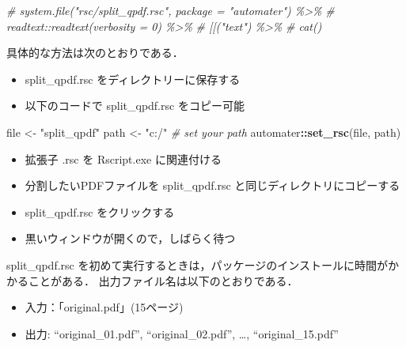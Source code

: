 \documentclass[
]{article}
\newenvironment{Shaded}{\begin{snugshade}}{\end{snugshade}}
\newcommand{\CommentTok}[1]{\textcolor[rgb]{0.56,0.35,0.01}{\textit{#1}}}
\newcommand{\FunctionTok}[1]{\textcolor[rgb]{0.13,0.29,0.53}{\textbf{#1}}}
\newcommand{\NormalTok}[1]{#1}
\newcommand{\OtherTok}[1]{\textcolor[rgb]{0.56,0.35,0.01}{#1}}
\newcommand{\SpecialCharTok}[1]{\textcolor[rgb]{0.81,0.36,0.00}{\textbf{#1}}}
\newcommand{\StringTok}[1]{\textcolor[rgb]{0.31,0.60,0.02}{#1}}
\providecommand{\tightlist}{%
  \setlength{\itemsep}{0pt}\setlength{\parskip}{0pt}}
\begin{document}
\begin{Shaded}
\begin{Highlighting}[]
  \CommentTok{\# system.file("rsc/split\_qpdf.rsc", package = "automater") \%\textgreater{}\%}
  \CommentTok{\#   readtext::readtext(verbosity = 0) \%\textgreater{}\%}
  \CommentTok{\#   \textasciigrave{}[[\textasciigrave{}("text") \%\textgreater{}\%}
  \CommentTok{\#   cat()}
\end{Highlighting}
\end{Shaded}

具体的な方法は次のとおりである．

\begin{itemize}
\tightlist
\item
  split\_qpdf.rsc をディレクトリーに保存する\\
\item
  以下のコードで split\_qpdf.rsc をコピー可能
\end{itemize}

\begin{Shaded}
\begin{Highlighting}[]
\NormalTok{file }\OtherTok{\textless{}{-}} \StringTok{"split\_qpdf"}
\NormalTok{path }\OtherTok{\textless{}{-}} \StringTok{"c:/"} \CommentTok{\# set your path}
\NormalTok{automater}\SpecialCharTok{::}\FunctionTok{set\_rsc}\NormalTok{(file, path)}
\end{Highlighting}
\end{Shaded}

\begin{itemize}
\tightlist
\item
  拡張子 .rsc を Rscript.exe に関連付ける\\
\item
  分割したいPDFファイルを split\_qpdf.rsc と同じディレクトリにコピーする\\
\item
  split\_qpdf.rsc をクリックする\\
\item
  黒いウィンドウが開くので，しばらく待つ
\end{itemize}

split\_qpdf.rsc を初めて実行するときは，パッケージのインストールに時間がかかることがある．
出力ファイル名は以下のとおりである．

\begin{itemize}
\tightlist
\item
  入力：「original.pdf」(15ページ)\\
\item
  出力: ``original\_01.pdf'', ``original\_02.pdf'', \ldots, ``original\_15.pdf''
\end{itemize}
\end{document}
